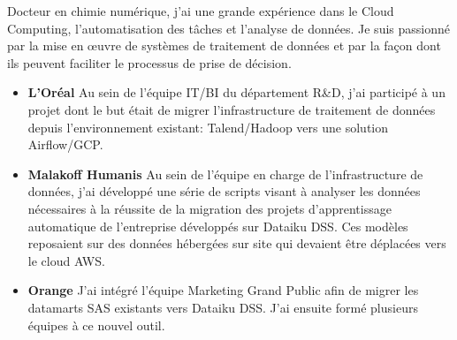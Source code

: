 \documentclass[10pt,a4paper,ragged2e,academicons]{altacv}
\begin{document}

\begin{fullwidth}
\makecvheader
\parbox{.7\paperwidth}{%
Docteur en chimie numérique, j'ai une grande expérience dans le Cloud Computing, l'automatisation des tâches et l'analyse de données. 
Je suis passionné par la mise en œuvre de systèmes de traitement de données et par la façon dont ils peuvent faciliter le processus de prise de décision.
}

\end{fullwidth}



\begin{itemize}
\justifying
\item \textbf{L’Oréal} Au sein de l’équipe IT/BI du département R\&D, j'ai participé à un projet dont le but était de migrer l’infrastructure de traitement de données depuis l'environnement existant: Talend/Hadoop vers une solution Airflow/GCP.
\end{itemize}

\divider

\begin{itemize}
\justifying
\item \textbf{Malakoff Humanis} Au sein de l'équipe en charge de l'infrastructure de données, j'ai développé une série de scripts visant à analyser les données nécessaires à la réussite de la migration des projets d'apprentissage automatique de l'entreprise développés sur Dataiku DSS. Ces modèles reposaient sur des données hébergées sur site qui devaient être déplacées vers le cloud AWS.
\item \textbf{Orange} J'ai intégré l'équipe Marketing Grand Public afin de migrer les datamarts SAS existants vers Dataiku DSS. J'ai ensuite formé plusieurs équipes à ce nouvel outil.\end{itemize}
\end{document}
